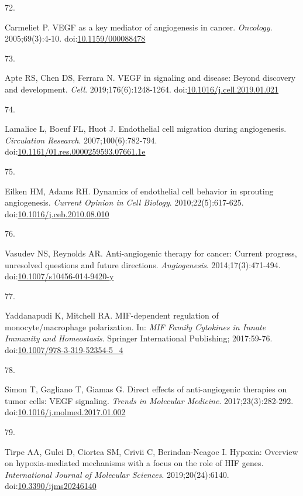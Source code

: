 \documentclass[11pt]{umnthesis}
\newlength{\csllabelwidth}
\newlength{\cslhangindent}
\newenvironment{CSLReferences}[2] %
 {%
  \setlength{\parindent}{0pt}
  \ifodd #1 \everypar{\setlength{\hangindent}{\cslhangindent}}\ignorespaces\fi
  \ifnum #2 > 0
  \setlength{\parskip}{#2\baselineskip}
  \fi
 }%
 {}
\newcommand{\CSLLeftMargin}[1]{\parbox[t]{\csllabelwidth}{#1}}
\newcommand{\CSLRightInline}[1]{\parbox[t]{\linewidth - \csllabelwidth}{#1}}
\begin{document}
\begin{CSLReferences}{0}{0}
\leavevmode{}%
\CSLLeftMargin{72. }
\CSLRightInline{Carmeliet P. {VEGF} as a key mediator of angiogenesis in cancer. \emph{Oncology}. 2005;69(3):4-10. doi:\href{https://doi.org/10.1159/000088478}{10.1159/000088478}}

\leavevmode{}%
\CSLLeftMargin{73. }
\CSLRightInline{Apte RS, Chen DS, Ferrara N. {VEGF} in signaling and disease: Beyond discovery and development. \emph{Cell}. 2019;176(6):1248-1264. doi:\href{https://doi.org/10.1016/j.cell.2019.01.021}{10.1016/j.cell.2019.01.021}}

\leavevmode{}%
\CSLLeftMargin{74. }
\CSLRightInline{Lamalice L, Boeuf FL, Huot J. Endothelial cell migration during angiogenesis. \emph{Circulation Research}. 2007;100(6):782-794. doi:\href{https://doi.org/10.1161/01.res.0000259593.07661.1e}{10.1161/01.res.0000259593.07661.1e}}

\leavevmode{}%
\CSLLeftMargin{75. }
\CSLRightInline{Eilken HM, Adams RH. Dynamics of endothelial cell behavior in sprouting angiogenesis. \emph{Current Opinion in Cell Biology}. 2010;22(5):617-625. doi:\href{https://doi.org/10.1016/j.ceb.2010.08.010}{10.1016/j.ceb.2010.08.010}}

\leavevmode{}%
\CSLLeftMargin{76. }
\CSLRightInline{Vasudev NS, Reynolds AR. Anti-angiogenic therapy for cancer: Current progress, unresolved questions and future directions. \emph{Angiogenesis}. 2014;17(3):471-494. doi:\href{https://doi.org/10.1007/s10456-014-9420-y}{10.1007/s10456-014-9420-y}}

\leavevmode{}%
\CSLLeftMargin{77. }
\CSLRightInline{Yaddanapudi K, Mitchell RA. {MIF}-dependent regulation of monocyte/macrophage polarization. In: \emph{{MIF} Family Cytokines in Innate Immunity and Homeostasis}. Springer International Publishing; 2017:59-76. doi:\href{https://doi.org/10.1007/978-3-319-52354-5_4}{10.1007/978-3-319-52354-5\_4}}

\leavevmode{}%
\CSLLeftMargin{78. }
\CSLRightInline{Simon T, Gagliano T, Giamas G. Direct effects of anti-angiogenic therapies on tumor cells: {VEGF} signaling. \emph{Trends in Molecular Medicine}. 2017;23(3):282-292. doi:\href{https://doi.org/10.1016/j.molmed.2017.01.002}{10.1016/j.molmed.2017.01.002}}

\leavevmode{}%
\CSLLeftMargin{79. }
\CSLRightInline{Tirpe AA, Gulei D, Ciortea SM, Crivii C, Berindan-Neagoe I. Hypoxia: Overview on hypoxia-mediated mechanisms with a focus on the role of {HIF} genes. \emph{International Journal of Molecular Sciences}. 2019;20(24):6140. doi:\href{https://doi.org/10.3390/ijms20246140}{10.3390/ijms20246140}}


\end{CSLReferences}
\end{document}
